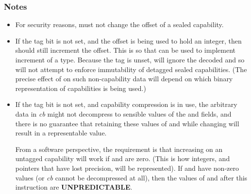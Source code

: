 \subsubsection*{Notes}

\begin{itemize}
\item
For security reasons,  must not change the offset
of a sealed capability.
\item
If the tag bit is not set, and the offset is being used to hold an integer,
then  should still increment the offset. This is
so that  can be used to implement increment of
a  type.
Because the tag is unset, 
will ignore the decoded \cotype{} and so will not attempt to enforce
immutability of detagged sealed capabilities.
(The precise effect of  on such
non-capability data will depend on which binary representation of
capabilities is being used.)
\item
If the tag bit is not set, and capability compression is in use,
the arbitrary data in \emph{cb} might not decompress to sensible values
of the \cbase{} and \clength{} fields, and there is no guarantee that
retaining these values of \cbase{} and \clength{} while changing
\coffset{} will result in a representable value.

From a software perspective, the requirement is that increasing \coffset{}
on an untagged capability will work if \cbase{} and \clength{} are zero. (This
is how integers, and pointers that have lost precision, will be represented).
If \cbase{} and \clength{} have non-zero values (or \emph{cb} cannot be
decompressed at all), then the values of \cbase{} and \clength{} after this
instruction are \textbf{UNPREDICTABLE}.
\end{itemize}
